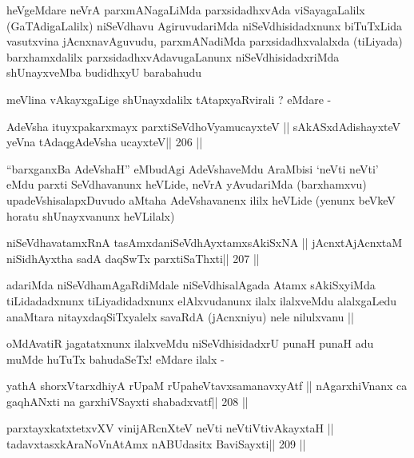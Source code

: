 \begin{artha}
heVgeMdare neVrA parxmANagaLiMda parxsidadhxvAda viSayagaLalilx
(GaTAdigaLalilx) niSeVdhavu AgiruvudariMda niSeVdhisidadxnunx
biTuTxLida vasutxvina jAcnxnavAguvudu, parxmANadiMda
parxsidadhxvalalxda (tiLiyada) barxhamxdalilx
parxsidadhxvAdavugaLanunx niSeVdhisidadxriMda shUnayxveMba budidhxyU
barabahudu

meVlina vAkayxgaLige shUnayxdalilx tAtapxyaRvirali ? eMdare -
\end{artha}

\begin{shl}
AdeVsha ituyxpakarxmayx parxtiSeVdhoV\s yamucayxteV ||
sAkASxdAdishayxteV yeVna tAdaqgAdeVsha ucayxteV\hfill || 206 ||
\end{shl}

\begin{artha}
``barxganxBa AdeVshaH'' eMbudAgi AdeVshaveMdu AraMbisi `neVti neVti'
  eMdu parxti SeVdhavanunx heVLide, neVrA yAvudariMda (barxhamxvu)
  upadeVshisalapxDuvudo aMtaha AdeVshavanenx ililx heVLide (yenunx
  beVkeV horatu shUnayxvanunx heVLilalx)
\end{artha}

\begin{shl}
niSeVdhavatamxRnA tasAmxdaniSeVdhAyxtamxsAkiSxNA ||
jAcnxtAjAcnxtaM niSidhAyxtha sadA daqSwTx parxtiSaThxti\hfill || 207 ||
\end{shl}

\begin{artha}
adariMda niSeVdhamAgaRdiMdale niSeVdhisalAgada Atamx sAkiSxyiMda
tiLidadadxnunx tiLiyadidadxnunx elAlxvudanunx ilalx ilalxveMdu
alalxgaLedu anaMtara nitayxdaqSiTxyalelx savaRdA (jAcnxniyu) nele
nilulxvanu ||
\end{artha}

\begin{artha}
oMdAvatiR jagatatxnunx ilalxveMdu niSeVdhisidadxrU punaH punaH adu
muMde huTuTx bahudaSeTx! eMdare ilalx -
\end{artha}

\begin{shl}
yathA shorxVtarxdhiyA rUpaM rUpaheVtavxsamanavxyAtf ||
nAgarxhiVnanx ca gaqhANxti na garxhiVSayxti shabadxvatf\hfill || 208 ||
\end{shl}

\begin{shl}
parxtayxkatxtetxvXV vinijARcnXteV neVti neVtiVtivAkayxtaH ||
tadavxtasxkAraNoV\s nAtAmx nABUdasitx BaviSayxti\hfill || 209 ||
\end{shl}

